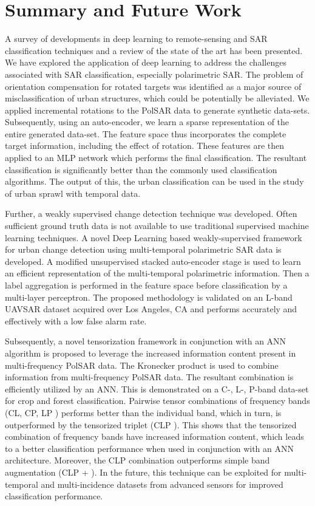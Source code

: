 \chapter{Summary and Future Work}

A survey of developments in deep learning to remote-sensing and SAR classification techniques and a review of the state of the art has been presented. We have explored the application of deep learning to address the challenges associated with SAR classification, especially polarimetric SAR. The problem of orientation compensation for rotated targets was identified as a major source of misclassification of urban structures, which could be potentially be alleviated. We applied incremental rotations to the PolSAR data to generate synthetic data-sets. Subsequently, using an auto-encoder, we learn a sparse representation of the entire generated data-set. The feature space thus incorporates the complete target information, including the effect of rotation. These features are then applied to an MLP network which performs the final classification. The resultant classification is significantly better than the commonly used classification algorithms. The output of this, the urban classification can be used in the study of urban sprawl with temporal data. 

Further, a weakly supervised change detection technique was developed. 
Often sufficient ground truth data is not available to use traditional supervised machine learning techniques. A novel Deep Learning based weakly-supervised framework for urban change detection using multi-temporal polarimetric SAR data is developed. A modified unsupervised stacked auto-encoder stage is used to learn an efficient representation of the multi-temporal polarimetric information. Then a label aggregation is performed in the feature space before classification by a multi-layer perceptron. The proposed methodology is validated on an L-band UAVSAR dataset acquired over Los Angeles, CA and performs accurately and effectively with a low false alarm rate.  

Subsequently, a novel tensorization framework in conjunction with an ANN algorithm is proposed to leverage the increased information content present in multi-frequency PolSAR data. The Kronecker product is used to combine information from multi-frequency PolSAR data. The resultant combination is efficiently utilized by an ANN. This is demonstrated on a C-, L-, P-band data-set for crop and forest classification. Pairwise tensor combinations of frequency bands (CL, CP, LP ) performs better than the individual band, which in turn, is outperformed by the tensorized triplet (CLP ). This shows that the tensorized combination of frequency bands have increased information content, which leads to a better classification performance when used in conjunction with an ANN architecture. Moreover, the CLP combination outperforms simple band
augmentation (CLP + ). In the future, this technique can be exploited for multi-temporal and multi-incidence datasets from advanced sensors for improved classification performance.

